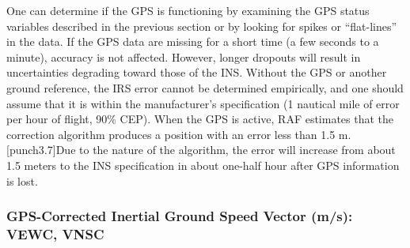 \documentclass[
  english,
]{book}
\begin{document}
One can determine if the GPS is functioning by examining the GPS status variables described in the previous section or by looking for spikes or ``flat-lines'' in the data. If the GPS data are missing for a short time (a few seconds to a minute), accuracy is not affected. However, longer dropouts will result in uncertainties degrading toward those of the INS. Without the GPS or another ground reference, the IRS error cannot be determined empirically, and one should assume that it is within the manufacturer's specification (1 nautical mile of error per hour of flight, 90\% CEP). When the GPS is active, RAF estimates that the correction algorithm produces a position with an error less than 1.5 m. \protect\hypertarget{punch3.7}{}{{[}punch3.7{]}}Due to the nature of the algorithm, the error will increase from about 1.5 meters to the INS specification in about one-half hour after GPS information is lost.

\hypertarget{vewc-vnsc}{%
\subsubsection*{GPS-Corrected Inertial Ground Speed Vector (m/s): VEWC, VNSC}\label{vewc-vnsc}}
\end{document}
